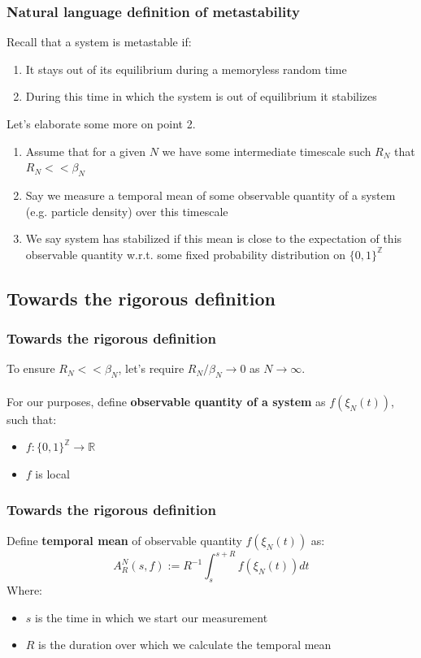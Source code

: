 \documentclass{beamer}
\begin{document}
\begin{frame}
    \frametitle{Natural language definition of metastability}

    Recall that a system is metastable if:
    \begin{enumerate}
        \item It stays out of its equilibrium during a memoryless random time
        \item During this time in which the system is out of equilibrium it stabilizes
    \end{enumerate}
    Let's elaborate some more on point 2.
    \begin{enumerate}
        \item Assume that for a given $N$ we have some intermediate timescale such $R_N$ that $R_N << \beta_N$
        \item Say we measure a temporal mean of some observable quantity of a system (e.g. particle density) over this timescale
        \item We say system has stabilized if this mean is close to the expectation of this observable quantity w.r.t. some fixed probability distribution on $\{0,1\}^{\mathbb{Z}}$
    \end{enumerate}
\end{frame}

\subsection{Towards the rigorous definition} %

\begin{frame}
    \frametitle{Towards the rigorous definition}
    To ensure $R_N << \beta_N$, let's require $R_N / \beta_N \rightarrow 0$ as $N \rightarrow \infty$.
    \\~\\ 
    For our purposes, define \textbf{observable quantity of a system} as $f(\xi_N(t))$, such that:
    \begin{itemize}
        \item $f : \{0,1\}^{\mathbb{Z}} \rightarrow \mathbb{R}$
        \item $f$ is local
    \end{itemize}
\end{frame}

\begin{frame}
    \frametitle{Towards the rigorous definition}

    Define \textbf{temporal mean} of observable quantity $f(\xi_N(t))$ as:
    \[
        A^N_R(s, f) := R^{-1}\int_s^{s+R}f(\xi_N(t))dt
    \]
    Where:
    \begin{itemize}
        \item $s$ is the time in which we start our measurement
        \item $R$ is the duration over which we calculate the temporal mean
    \end{itemize}
\end{frame}
\end{document}
